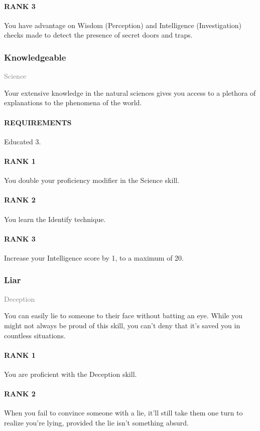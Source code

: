 \paragraph{RANK 3} You have advantage on Wisdom (Perception) and Intelligence (Investigation) checks made to detect the presence of secret doors and traps.

\subsubsection{Knowledgeable} \label{feat::knowledgeable}
\small{\textcolor{gray}{Science}}

\normalsize
Your extensive knowledge in the natural sciences gives you access to a plethora of explanations to the phenomena of the world.
\paragraph{REQUIREMENTS} Educated 3.
\paragraph{RANK 1} You double your proficiency modifier in the Science skill.
\paragraph{RANK 2} You learn the Identify technique.
\paragraph{RANK 3} Increase your Intelligence score by 1, to a maximum of 20.

\subsubsection{Liar} \label{feat::liar}
\small{\textcolor{gray}{Deception}}

\normalsize
You can easily lie to someone to their face without batting an eye.
While you might not always be proud of this skill, you can't deny that it's saved you in countless situations.
\paragraph{RANK 1} You are proficient with the Deception skill.
\paragraph{RANK 2} When you fail to convince someone with a lie, it'll still take them one turn to realize you're lying, provided the lie isn't something absurd.
